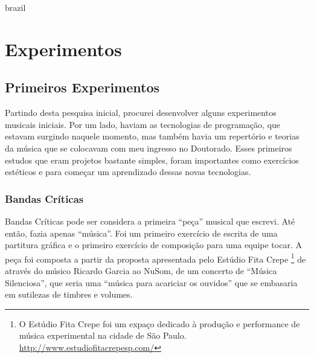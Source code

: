 %


\begin{otherlanguage*}{brazil}

    \chapter[Experimentos]{Experimentos}


    \begin{flushright}
         
    \end{flushright}


\section{Primeiros Experimentos}

Partindo desta pesquisa inicial, procurei desenvolver alguns experimentos musicais iniciais.  Por um lado, haviam as tecnologias de programação, que estavam surgindo naquele momento, mas também havia um repertório e teorias da música que se colocavam com meu ingresso no Doutorado. Esses primeiros estudos que eram projetos bastante simples, foram importantes como exercícios estéticos e para começar um aprendizado dessas novas tecnologias.


\subsection{Bandas Críticas}
Bandas Críticas pode ser considera a primeira ``peça'' musical que escrevi. Até então, fazia apenas ``música''. Foi um primeiro exercício de escrita de uma partitura gráfica e o primeiro exercício de composição para uma equipe tocar. A peça foi composta a partir da proposta apresentada pelo Estúdio Fita Crepe \footnote{O Estúdio Fita Crepe foi um expaço dedicado à produção e performance de música experimental na cidade de São Paulo. \url{http://www.estudiofitacrepesp.com/}} de através do músico Ricardo Garcia ao NuSom, de um concerto de ``Música Silenciosa'', que seria uma ``música para acariciar os ouvidos'' que se embasaria em sutilezas de timbres e volumes.


\end{otherlanguage*}
